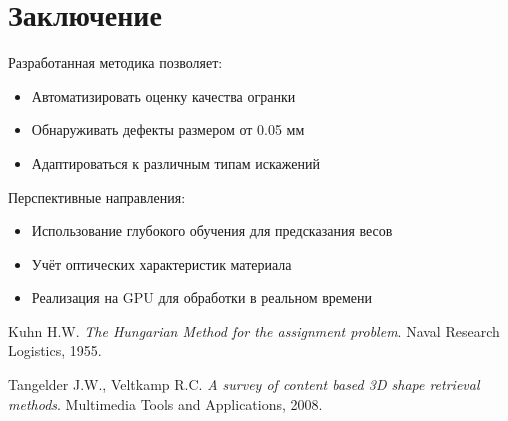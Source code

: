\documentclass[a4paper,12pt]{article}
\begin{document}
\section{Заключение}
Разработанная методика позволяет:
\begin{itemize}
    \item Автоматизировать оценку качества огранки
    \item Обнаруживать дефекты размером от 0.05 мм
    \item Адаптироваться к различным типам искажений
\end{itemize}

Перспективные направления:
\begin{itemize}
    \item Использование глубокого обучения для предсказания весов
    \item Учёт оптических характеристик материала
    \item Реализация на GPU для обработки в реальном времени
\end{itemize}

\begin{thebibliography}{9}
Kuhn H.W. 
\textit{The Hungarian Method for the assignment problem}. 
Naval Research Logistics, 1955.

Tangelder J.W., Veltkamp R.C. 
\textit{A survey of content based 3D shape retrieval methods}. 
Multimedia Tools and Applications, 2008.
\end{thebibliography}
\end{document}
